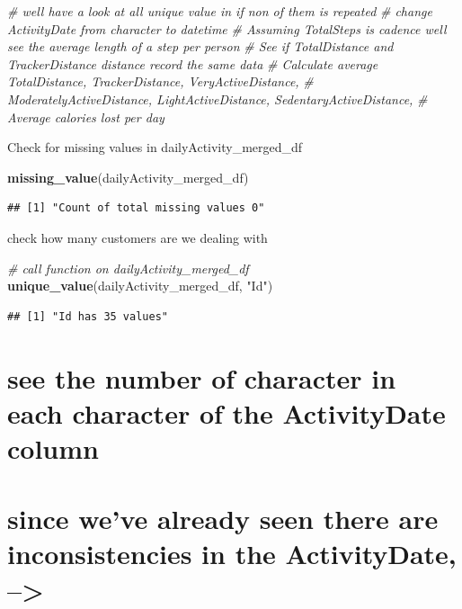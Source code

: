 \documentclass[
]{article}
\newenvironment{Shaded}{\begin{snugshade}}{\end{snugshade}}
\newcommand{\CommentTok}[1]{\textcolor[rgb]{0.56,0.35,0.01}{\textit{#1}}}
\newcommand{\FunctionTok}[1]{\textcolor[rgb]{0.13,0.29,0.53}{\textbf{#1}}}
\newcommand{\NormalTok}[1]{#1}
\newcommand{\StringTok}[1]{\textcolor[rgb]{0.31,0.60,0.02}{#1}}
\begin{document}
\begin{Shaded}
\begin{Highlighting}[]
\CommentTok{\# we\textquotesingle{}ll have a look at all unique value in if non of them is repeated}
\CommentTok{\# change ActivityDate from character to datetime}
\CommentTok{\# Assuming TotalSteps is cadence we\textquotesingle{}ll see the average length of a step per person}
\CommentTok{\# See if TotalDistance and TrackerDistance distance record the same data}
\CommentTok{\# Calculate average TotalDistance, TrackerDistance, VeryActiveDistance, }
\CommentTok{\# ModeratelyActiveDistance, LightActiveDistance, SedentaryActiveDistance,}
\CommentTok{\# Average calories lost per day}
\end{Highlighting}
\end{Shaded}

Check for missing values in dailyActivity\_merged\_df

\begin{Shaded}
\begin{Highlighting}[]
\FunctionTok{missing\_value}\NormalTok{(dailyActivity\_merged\_df)}
\end{Highlighting}
\end{Shaded}

\begin{verbatim}
## [1] "Count of total missing values 0"
\end{verbatim}

check how many customers are we dealing with

\begin{Shaded}
\begin{Highlighting}[]
\CommentTok{\# call function on dailyActivity\_merged\_df}
\FunctionTok{unique\_value}\NormalTok{(dailyActivity\_merged\_df, }\StringTok{"Id"}\NormalTok{)}
\end{Highlighting}
\end{Shaded}

\begin{verbatim}
## [1] "Id has 35 values"
\end{verbatim}

\section{see the number of character in each character of the
ActivityDate
column}\label{see-the-number-of-character-in-each-character-of-the-activitydate-column}

\section{since we've already seen there are inconsistencies in the
ActivityDate,
--\textgreater{}}\label{since-weve-already-seen-there-are-inconsistencies-in-the-activitydate}
\end{document}
